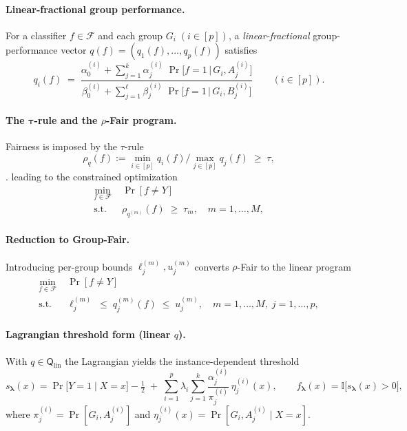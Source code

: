 \documentclass[12pt,a4paper,openright,twoside]{book}
\begin{document}
\paragraph{Linear-fractional group performance.}
For a classifier $f\!\in\!\mathcal{F}$ and each group $G_i\;(i\!\in\![p])$, a \emph{linear-fractional} group-performance vector $q(f)=(q_1(f),\dots,q_p(f))$ satisfies \cite{celis2020classificationfairnessconstraintsmetaalgorithm}
\[
q_i(f)\;=\;
\frac{\displaystyle 
\alpha^{(i)}_0+\sum_{j=1}^{k}\alpha^{(i)}_j\;
      \Pr\!\bigl[f=1\,\bigl\vert\,G_i,A^{(i)}_{j}\bigr]}
     {\displaystyle
      \beta^{(i)}_0+\sum_{j=1}^{\ell}\beta^{(i)}_j\;
      \Pr\!\bigl[f=1\,\bigl\vert\,G_i,B^{(i)}_{j}\bigr]}
\qquad(i\in[p]).
\]

\paragraph{The $\boldsymbol{\tau}$-rule and the \texorpdfstring{$\rho$}{rho}-Fair program.}
Fairness is imposed by the $\tau$-rule
\[
\rho_q(f):=\min_{i\in[p]}q_i(f)/\max_{j\in[p]}q_j(f)\;\ge\;\tau,
\] \cite{celis2020classificationfairnessconstraintsmetaalgorithm}.
leading to the constrained optimization
\[
\begin{aligned}
\min_{f\in\mathcal{F}}\;&\Pr[f\neq Y]\\
\text{s.t.}\;&\rho_{q^{(m)}}(f)\;\ge\;\tau_m,\quad m=1,\dots,M,
\end{aligned}
\tag{$\rho$-Fair} %
\]

\paragraph{Reduction to Group-Fair.}
Introducing per-group bounds $\ell_j^{(m)},u_j^{(m)}$ converts $\rho$-Fair to the linear program \cite{celis2020classificationfairnessconstraintsmetaalgorithm}
\[
\begin{aligned}
\min_{f\in\mathcal{F}}\;&\Pr[f\neq Y]\\
\text{s.t.}\;&\ell^{(m)}_j\;\le\;q^{(m)}_j(f)\;\le\;u^{(m)}_j,
\quad m=1,\dots,M,\;j=1,\dots,p,
\end{aligned}
\tag{Group-Fair}
\]

\paragraph{Lagrangian threshold form (linear $q$).}
With $q\in\mathsf{Q}_{\text{lin}}$ the Lagrangian yields the instance-dependent threshold \cite{celis2020classificationfairnessconstraintsmetaalgorithm}
\[
s_{\boldsymbol\lambda}(x)=
\Pr\!\bigl[Y=1\mid X=x\bigr]-\tfrac12
\;+\;
\sum_{i=1}^{p}\lambda_i
  \sum_{j=1}^{k}
      \frac{\alpha^{(i)}_j}{\pi^{(i)}_j}\,
      \eta^{(i)}_j(x),
\qquad
f_{\boldsymbol\lambda}(x)=\mathbb{I}\bigl[s_{\boldsymbol\lambda}(x)>0\bigr],
\]
where $\pi^{(i)}_j=\Pr[G_i,A^{(i)}_j]$ and $\eta^{(i)}_j(x)=\Pr[G_i,A^{(i)}_j\mid X=x]$.
\end{document}
